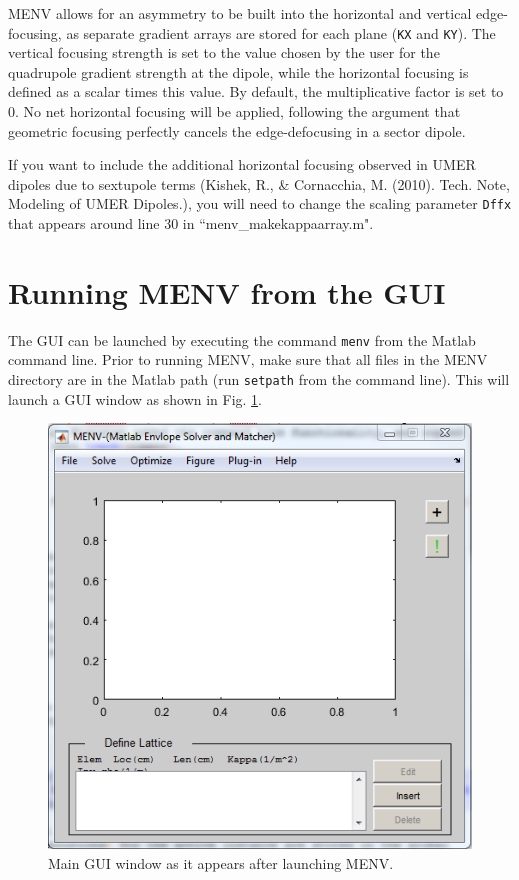 \documentclass[../menv_main.tex]{subfiles}
\begin{document}
MENV allows for an asymmetry to be built into the horizontal and vertical edge-focusing, as separate gradient arrays are stored for each plane (\verb|KX| and \verb|KY|). The vertical focusing strength is set to the value chosen by the user for the quadrupole gradient strength at the dipole, while the horizontal focusing is defined as a scalar times this value. By default, the multiplicative factor is set to 0. No net horizontal focusing will be applied, following the argument that geometric focusing perfectly cancels the edge-defocusing in a sector dipole. 

If you want to include the additional horizontal focusing observed in UMER dipoles due to sextupole terms (Kishek, R., \& Cornacchia, M. (2010). Tech. Note, Modeling of UMER Dipoles.), you will need to change the scaling parameter \verb|Dffx| that appears around line 30 in ``menv\_makekappaarray.m".

\section{Running MENV from the GUI}

The GUI can be launched by executing the command \verb|menv| from the Matlab command line. Prior to running MENV, make sure that all files in the MENV directory are in the Matlab path (run \verb|setpath| from the command line). This will launch a GUI window as shown in Fig. \ref{fig:main}.

\begin{figure}
\centering
\includegraphics{figures/main_gui_window.png}
\caption{Main GUI window as it appears after launching MENV.}
\label{fig:main}
\end{figure}
\end{document}

